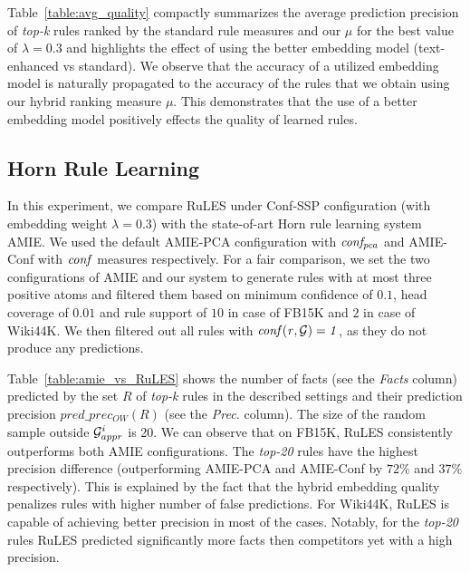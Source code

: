 

Table~\ref{table:avg_quality} compactly summarizes the average prediction precision of \textit{top-k} rules ranked by
the standard rule measures and our $\mu$ for the best value of $\lambda=0.3$ and highlights the effect of using the better embedding model (text-enhanced vs standard).
We observe that the accuracy of a utilized embedding model is naturally propagated to the accuracy of the rules that we obtain using our hybrid ranking measure $\mu$. This demonstrates that the use of a better embedding model positively effects 
the quality of learned rules. 


\subsection{Horn Rule Learning}
\label{sec:RuLES_vs_AMIE}




In this experiment, we compare RuLES under Conf-SSP configuration (with embedding weight $\lambda = 0.3$) with the state-of-art Horn rule learning system AMIE. We used the default AMIE-PCA configuration with $\mathit{conf_{pca}}$ and 
AMIE-Conf with $\mathit{conf}$ measures respectively. For a fair comparison, we set the two configurations of AMIE and our system  to generate rules with at most three positive atoms and filtered them based on minimum confidence of $0.1$, head coverage of $0.01$ and rule support of $10$ in case of FB15K and $2$ in case of Wiki44K. We then filtered out all rules with $\mathit{conf(r,\mathcal{G}) = 1}$, as they 
do not produce any predictions.

Table~\ref{table:amie_vs_RuLES} shows the number of facts (see the \textit{Facts} column) predicted by 
the set $R$ of \textit{top-k} rules 
in the described settings 
and their prediction precision $pred\_prec_{OW}(R)$ (see the \textit{Prec.} column). 
The size of the random sample 
outside $\mathcal{G}^i_{appr}$ is 20. 
We can observe that on FB15K, RuLES consistently outperforms both AMIE configurations. The \textit{top-20} rules have the highest precision difference (outperforming AMIE-PCA and AMIE-Conf by $72\%$ and $37\%$ respectively).
This is explained by the fact that the hybrid embedding quality penalizes rules with higher number of false predictions. 
For Wiki44K, RuLES is capable of achieving better precision in most of the cases. 
Notably, for the \textit{top-20} rules RuLES predicted significantly more facts then competitors yet with a high precision. 

